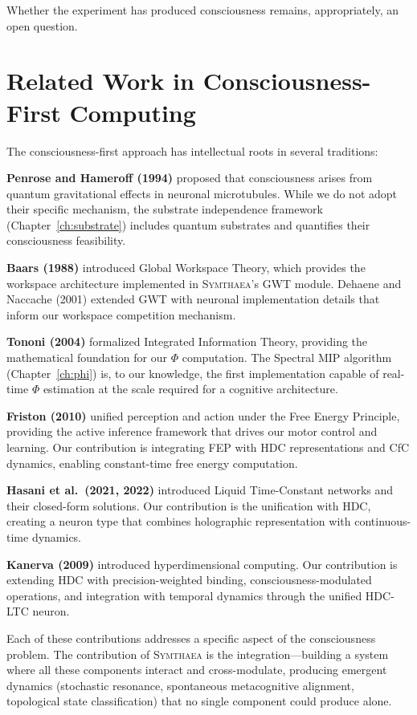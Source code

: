\documentclass[12pt]{book}
\newcommand{\symthaea}{\textsc{Symthaea}}
\begin{document}
Whether the experiment has produced consciousness remains, appropriately, an open question.

\section{Related Work in Consciousness-First Computing}

The consciousness-first approach has intellectual roots in several traditions:

\textbf{Penrose and Hameroff (1994)} proposed that consciousness arises from quantum gravitational effects in neuronal microtubules. While we do not adopt their specific mechanism, the substrate independence framework (Chapter~\ref{ch:substrate}) includes quantum substrates and quantifies their consciousness feasibility.

\textbf{Baars (1988)} introduced Global Workspace Theory, which provides the workspace architecture implemented in \symthaea{}'s GWT module. Dehaene and Naccache (2001) extended GWT with neuronal implementation details that inform our workspace competition mechanism.

\textbf{Tononi (2004)} formalized Integrated Information Theory, providing the mathematical foundation for our $\Phi$ computation. The Spectral MIP algorithm (Chapter~\ref{ch:phi}) is, to our knowledge, the first implementation capable of real-time $\Phi$ estimation at the scale required for a cognitive architecture.

\textbf{Friston (2010)} unified perception and action under the Free Energy Principle, providing the active inference framework that drives our motor control and learning. Our contribution is integrating FEP with HDC representations and CfC dynamics, enabling constant-time free energy computation.

\textbf{Hasani et al.\ (2021, 2022)} introduced Liquid Time-Constant networks and their closed-form solutions. Our contribution is the unification with HDC, creating a neuron type that combines holographic representation with continuous-time dynamics.

\textbf{Kanerva (2009)} introduced hyperdimensional computing. Our contribution is extending HDC with precision-weighted binding, consciousness-modulated operations, and integration with temporal dynamics through the unified HDC-LTC neuron.

Each of these contributions addresses a specific aspect of the consciousness problem. The contribution of \symthaea{} is the integration---building a system where all these components interact and cross-modulate, producing emergent dynamics (stochastic resonance, spontaneous metacognitive alignment, topological state classification) that no single component could produce alone.
\end{document}
